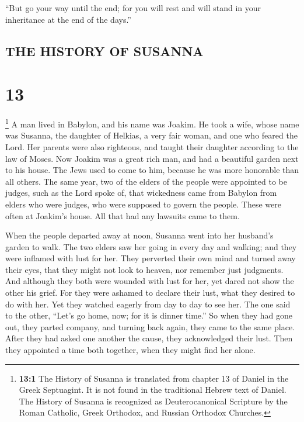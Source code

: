 ``But go your way until the end; for you will rest and
will stand in your inheritance at the end of the days.''

\hypertarget{the-history-of-susanna}{%
\subsection{THE HISTORY OF SUSANNA}\label{the-history-of-susanna}}

\hypertarget{section-12}{%
\section{13}\label{section-12}}

 \footnote{\textbf{13:1} The History of Susanna is
  translated from chapter 13 of Daniel in the Greek Septuagint. It is
  not found in the traditional Hebrew text of Daniel. The History of
  Susanna is recognized as Deuterocanonical Scripture by the Roman
  Catholic, Greek Orthodox, and Russian Orthodox Churches.} A man lived
in Babylon, and his name was Joakim.  He took a wife,
whose name was Susanna, the daughter of Helkias, a very fair woman, and
one who feared the Lord.  Her parents were also righteous,
and taught their daughter according to the law of Moses. 
Now Joakim was a great rich man, and had a beautiful garden next to his
house. The Jews used to come to him, because he was more honorable than
all others.  The same year, two of the elders of the
people were appointed to be judges, such as the Lord spoke of, that
wickedness came from Babylon from elders who were judges, who were
supposed to govern the people.  These were often at
Joakim's house. All that had any lawsuits came to them.

 When the people departed away at noon, Susanna went into
her husband's garden to walk.  The two elders saw her
going in every day and walking; and they were inflamed with lust for
her.  They perverted their own mind and turned away their
eyes, that they might not look to heaven, nor remember just judgments.
 And although they both were wounded with lust for her,
yet dared not show the other his grief.  For they were
ashamed to declare their lust, what they desired to do with her.
 Yet they watched eagerly from day to day to see her.
 The one said to the other, ``Let's go home, now; for it
is dinner time.''  So when they had gone out, they parted
company, and turning back again, they came to the same place. After they
had asked one another the cause, they acknowledged their lust. Then they
appointed a time both together, when they might find her alone.

